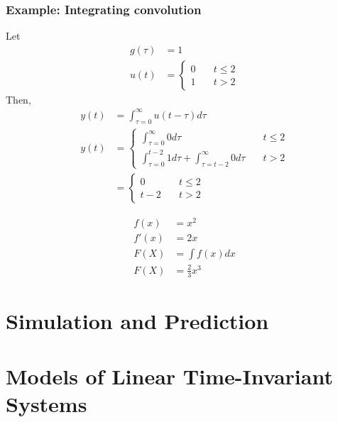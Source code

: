 \documentclass{article}
\begin{document}
\subsubsection{Example: Integrating convolution}
Let
\begin{align*}
    g(\tau)&=1 \\
    u(t)&=\left\{
        \begin{array}{ll}
            0 & \quad t \leq 2 \\
            1 & \quad t > 2
        \end{array}
    \right.
\end{align*}
Then,
\begin{align*}
    y(t) &= \int_{\tau=0}^\infty u(t - \tau) d\tau \\
    y(t) &= \left\{
        \begin{array}{ll}
            \int_{\tau=0}^\infty 0 d\tau & \quad t \leq 2 \\[.2cm]
            \int_{\tau=0}^{t-2} 1 d\tau
                + \int_{\tau=t-2}^\infty 0 d\tau & \quad t > 2
        \end{array}
    \right. \\
    &= \left\{
        \begin{array}{ll}
            0 & \quad t \leq 2 \\
            t - 2 & \quad t > 2
        \end{array}
    \right.
\end{align*}


\begin{align*}
    f(x) &= x^2\\
    f'(x) &= 2x\\
    F(X) &= \int f(x)dx\\
    F(X) &= \frac{2}{3}x^3
\end{align*}

\section{Simulation and Prediction}
\section{Models of Linear Time-Invariant Systems}
\end{document}
